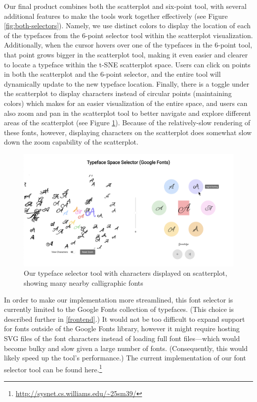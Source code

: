 Our final product combines both the scatterplot and six-point tool, with several additional features to make the tools work together effectively (see Figure \ref{fig:both-selectors}). Namely, we use distinct colors to display the location of each of the typefaces from the 6-point selector tool within the scatterplot visualization. Additionally, when the cursor hovers over one of the typefaces in the 6-point tool, that point grows bigger in the scatterplot tool, making it even easier and clearer to locate a typeface within the t-SNE scatterplot space. Users can click on points in both the scatterplot and the 6-point selector, and the entire tool will dynamically update to the new typeface location. Finally, there is a toggle under the scatterplot to display characters instead of circular points (maintaining colors) which makes for an easier visualization of the entire space, and users can also zoom and pan in the scatterplot tool to better navigate and explore different areas of the scatterplot (see Figure \ref{fig:tool-with-chars}). Because of the relatively-slow rendering of these fonts, however, displaying characters on the scatterplot does somewhat slow down the zoom capability of the scatterplot.

\begin{figure}[h]
    \centering
    \includegraphics[width=\textwidth]{images/tool-with-chars.png}
    \caption{Our typeface selector tool with characters displayed on scatterplot, showing many nearby calligraphic fonts}
    \label{fig:tool-with-chars}
\end{figure}

In order to make our implementation more streamlined, this font selector is currently limited to the Google Fonts collection of typefaces. (This choice is described further in \ref{frontend}.) It would not be too difficult to expand support for fonts outside of the Google Fonts library, however it might require hosting SVG files of the font characters instead of loading full font files---which would become bulky and slow given a large number of fonts. (Consequently, this would likely speed up the tool's performance.) The current implementation of our font selector tool can be found here.\footnote{\url{http://sysnet.cs.williams.edu/~25sm39/}}

